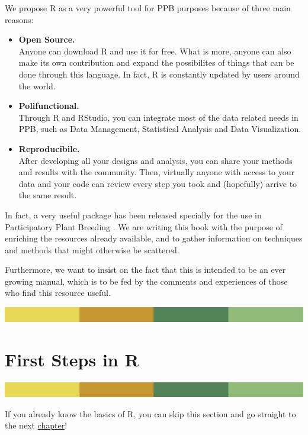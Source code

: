 \documentclass[
]{book}
\begin{document}
We propose R as a very powerful tool for PPB purposes because of three main reasons:

\begin{itemize}
\item
  \textbf{Open Source. }\\
  Anyone can download R and use it for free. What is more, anyone can also make its own contribution and expand the possibilites of things that can be done through this language. In fact, R is constantly updated by users around the world.
\item
  \textbf{Polifunctional. }\\
  Through R and RStudio, you can integrate most of the data related needs in PPB, such as Data Management, Statistical Analysis and Data Visualization.
\item
  \textbf{Reproducibile. }\\
  After developing all your designs and analysis, you can share your methods and results with the community. Then, virtually anyone with access to your data and your code can review every step you took and (hopefully) arrive to the same result.
\end{itemize}

In fact, a very useful package has been released specially for the use in Participatory Plant Breeding \citet{ppbstatsbook}. We are writing this book with the
purpose of enriching the resources already available, and to gather information on techniques and methods that might otherwise be scattered.

Furthermore, we want to insist on the fact that this is intended to be an ever growing manual, which is to be fed by the comments and experiences of those who find this resource useful.

\includegraphics{rsrstrip.png}

\hypertarget{first-steps-in-r}{%
\chapter{First Steps in R}\label{first-steps-in-r}}

\includegraphics{rsrstrip.png}

If you already know the basics of R, you can skip this section and go straight to the next \protect\hyperlink{data-wrangling-and-summarizing}{chapter}!
\end{document}
